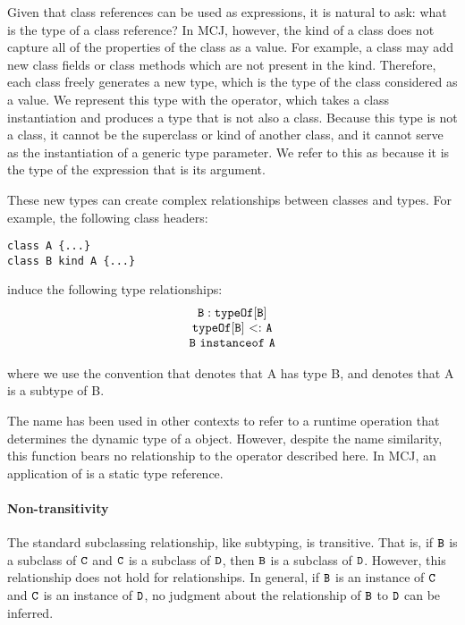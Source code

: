 \documentclass{acm-sigplan}
\begin{document}
Given that class references can be used as expressions, it is natural
to ask: what is the type of a class reference?  
In MCJ, however, the kind of a class does not capture all of the
properties of the class as a value.  For example, a class may add new
class fields or class methods which are not present in the kind.
Therefore, each class freely generates a new type, which is the type
of the class considered as a value.  We represent this type with the
{} operator, which takes a class instantiation and produces
a type that is not also a class.  Because this type is not a class, it
cannot be the superclass or kind of another class, and it cannot serve
as the instantiation of a generic type parameter.  We refer to this as
{} because it is the type of the expression that is its
argument.  

These new types can create complex relationships between classes and types.  For
example, the following class headers:

\begin{verbatim}
class A {...}
class B kind A {...}
\end{verbatim}

induce the following type relationships:
\begin{displaymath}
\begin{array}{c}
{\mbox {\tt B}} : {\mathtt{{typeOf}}\mathtt{{[}}\mbox {\tt B}\mathtt{{]}}} \\
{\mathtt{{typeOf}}\mathtt{{[}}\mbox {\tt B}\mathtt{{]}}} {\ <:\ } {\mbox {\tt A}} \\
\mbox {\tt B}~ {\mathtt {instanceof}}\ \mbox {\tt A}
\end{array}
\end{displaymath}

\hspace{-.43cm}where we use the convention that {} denotes
that {\txt A} has type {\txt B}, and {} denotes that {\txt A}
is a subtype of {\txt B}.

The name {} has been used in other contexts to refer to a
runtime operation that determines the dynamic type of a object.
However, despite the name similarity, this function bears no
relationship to the operator described here.  In MCJ, an application
of {} is a static type reference.

\paragraph{Non-transitivity}

The standard subclassing relationship, like subtyping, is transitive.
That is, if $\mbox {\tt B}$ is a subclass of $\mathtt{{C}}$ and $\mathtt{{C}}$ is a subclass of $\mbox {\tt D}$,
then $\mbox {\tt B}$ is a subclass of $\mbox {\tt D}$.  However, this relationship does not
hold for {} relationships.  In general, if $\mbox {\tt B}$ is an
instance of $\mathtt{{C}}$ and $\mathtt{{C}}$ is an instance of $\mbox {\tt D}$, no judgment
about the relationship of $\mbox {\tt B}$ to $\mbox {\tt D}$ can be inferred.
\end{document}
